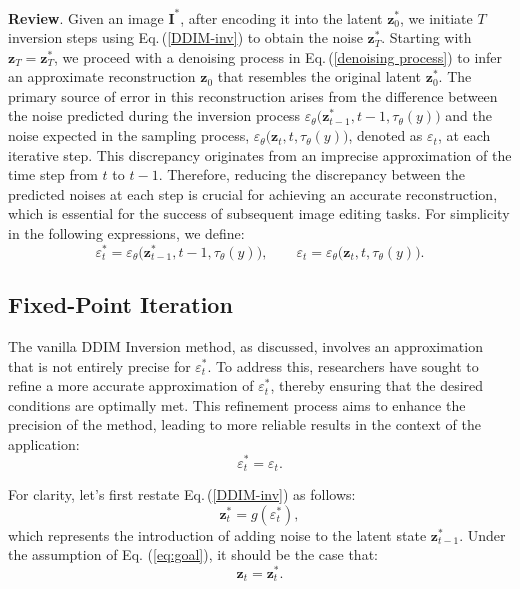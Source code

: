 \documentclass[letterpaper]{article} %
\begin{document}
\textbf{Review}. Given an image \(\mathbf{I}^*\), after encoding it into the latent \(\mathbf{z}^*_0\), we initiate \(T\) inversion steps using Eq.\,(\ref{DDIM-inv}) to obtain the noise \(\mathbf{z}^*_T\). Starting with \(\mathbf{z}_T = \mathbf{z}^*_T\), we proceed with a denoising process in Eq.\,(\ref{denoising process}) to infer an approximate reconstruction \(\mathbf{z}_0\) that resembles the original latent  \(\mathbf{z}^*_0\). The primary source of error in this reconstruction arises from the difference between the noise predicted during the inversion process \(\varepsilon_{\theta}\big(\mathbf{z}^*_{t-1}, t-1, \tau_{\theta}(y)\big)\) and the noise expected in the sampling process, \(\varepsilon_{\theta}\big(\mathbf{z}_t, t, \tau_{\theta}(y)\big)\), denoted as \(\varepsilon_t\), at each iterative step. This discrepancy originates from an imprecise approximation of the time step from \(t\) to \(t-1\). Therefore, reducing the discrepancy between the predicted noises at each step is crucial for achieving an accurate reconstruction, which is essential for the success of subsequent image editing tasks. For simplicity in the following expressions, we define:
%
\begin{equation}
    \varepsilon_{t}^* = \varepsilon_{\theta}\big(\mathbf{z}^*_{t-1},t-1,\tau_{\theta}(y)\big), \qquad \varepsilon_t = \varepsilon_{\theta}\big(\mathbf{z}_t,t,\tau_{\theta}(y)\big).
\end{equation}





\subsection{Fixed-Point Iteration}
\label{sec:motivation}
The vanilla DDIM Inversion method, as discussed, involves an approximation that is not entirely precise for \(\varepsilon_t^*\). To address this, researchers have sought to refine a more accurate approximation of \(\varepsilon_t^*\), thereby ensuring that the desired conditions are optimally met. This refinement process aims to enhance the precision of the method, leading to more reliable results in the context of the application:
\begin{equation}\label{eq:goal}
    \varepsilon_t^* = \varepsilon_t.
\end{equation}


For clarity, let's first restate Eq.\,(\ref{DDIM-inv}) as follows:
\begin{equation}\label{eq:forward}
\mathbf{z}^*_t = g(\varepsilon_t^*),
\end{equation}
which represents the introduction of adding noise to the latent state $\mathbf{z}^*_{t-1}$. Under the assumption of Eq. (\ref{eq:goal}), it should be the case that:
\begin{equation}\label{eq:condition}
\mathbf{z}_t = \mathbf{z}_t^*.
\end{equation}
\end{document}
